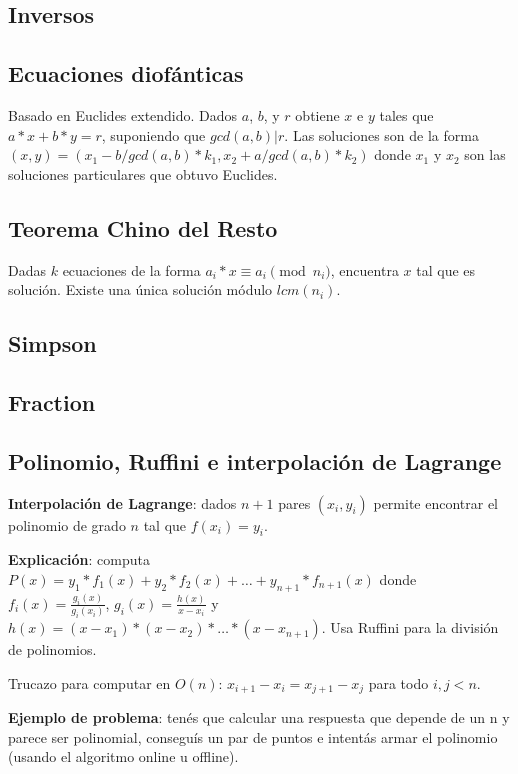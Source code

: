 {\subsection{Inversos}
\subsection{Ecuaciones diofánticas}
Basado en Euclides extendido. Dados $a$, $b$, y $r$ obtiene $x$ e $y$ tales que $a*x + b*y = r$, suponiendo que $gcd(a,b) | r$. Las soluciones son de la forma $(x, y) = (x_1 - b/gcd(a,b) * k_1, x_2 + a/gcd(a,b) * k_2)$ donde $x_1$ y $x_2$ son las soluciones particulares que obtuvo Euclides.
\subsection{Teorema Chino del Resto}
Dadas $k$ ecuaciones de la forma $a_i*x \equiv a_i \pmod {n_i}$, encuentra $x$ tal que es solución. Existe una única solución módulo $lcm(n_i)$.
\subsection{Simpson}
\subsection{Fraction}
\subsection{Polinomio, Ruffini e interpolación de Lagrange}
\textbf{Interpolación de Lagrange}: dados $n+1$ pares $(x_i, y_i)$  permite encontrar el polinomio de grado $n$ tal que $f(x_i) = y_i$. 

\textbf{Explicación}: computa $P(x) = y_1*f_1(x) + y_2*f_2(x) + \ldots + y_{n+1}*f_{n+1}(x)$ donde $f_i(x) = \frac{g_i(x)}{g_i(x_i)}$, $g_i(x) = \frac{h(x)}{x - x_i}$ y $h(x) = (x-x_1)*(x-x_2)*\ldots*(x-x_{n+1})$.
Usa Ruffini para la división de polinomios.

Trucazo para computar en \(O(n)\): \(x_{i + 1} - x_i = x_{j + 1} - x_j\) para todo \(i, j < n\).

\textbf{Ejemplo de problema}: tenés que calcular una respuesta que depende de un n y parece ser polinomial, conseguís un par de puntos e 
intentás armar el polinomio (usando el algoritmo online u offline).

}
